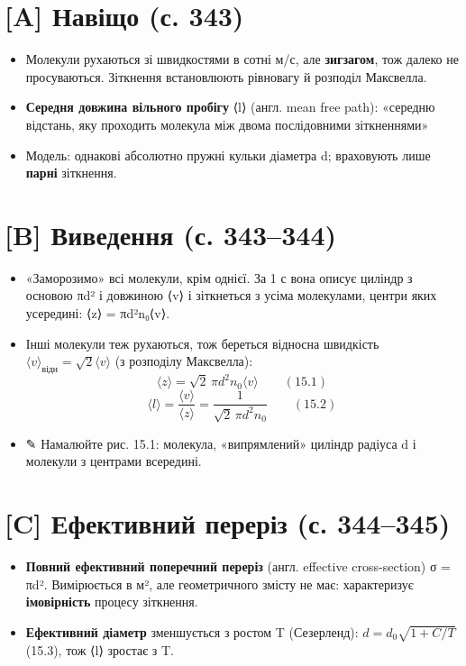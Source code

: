 \documentclass[11pt,a4paper,oneside]{book}
\newcommand{\pen}{{\sffamily\color{accent}✎}}
\begin{document}
\section*{[A] Навіщо (с. 343)}
\begin{itemize}
\item Молекули рухаються зі швидкостями в сотні м/с, але \textbf{зигзагом}, тож далеко не просуваються. Зіткнення встановлюють рівновагу й розподіл Максвелла.
\item \textbf{Середня довжина вільного пробігу} ⟨l⟩ (англ. mean free path): «середню відстань, яку проходить молекула між двома послідовними зіткненнями»
\item Модель: однакові абсолютно пружні кульки діаметра d; враховують лише \textbf{парні} зіткнення.
\end{itemize}

\section*{[B] Виведення (с. 343–344)}
\begin{itemize}
\item «Заморозимо» всі молекули, крім однієї. За 1 с вона описує циліндр з основою πd² і довжиною ⟨v⟩ і зіткнеться з усіма молекулами, центри яких усередині: ⟨z⟩ = πd²n₀⟨v⟩.
\item Інші молекули теж рухаються, тож береться відносна швидкість $\langle v\rangle_{\text{відн}} = \sqrt2\langle v\rangle$ (з розподілу Максвелла):
\[\langle z\rangle = \sqrt2\,\pi d^2n_0\langle v\rangle\qquad(15.1)\]
\[\langle l\rangle = \frac{\langle v\rangle}{\langle z\rangle} = \frac{1}{\sqrt2\,\pi d^2n_0}\qquad(15.2)\]
\item \pen{} Намалюйте рис. 15.1: молекула, «випрямлений» циліндр радіуса d і молекули з центрами всередині.
\end{itemize}

\section*{[C] Ефективний переріз (с. 344–345)}
\begin{itemize}
\item \textbf{Повний ефективний поперечний переріз} (англ. effective cross-section) σ = πd². Вимірюється в м², але геометричного змісту не має: характеризує \textbf{імовірність} процесу зіткнення.
\item \textbf{Ефективний діаметр} зменшується з ростом T (Сезерленд): $d = d_0\sqrt{1 + C/T}$ (15.3), тож ⟨l⟩ зростає з T.
\end{itemize}
\end{document}
